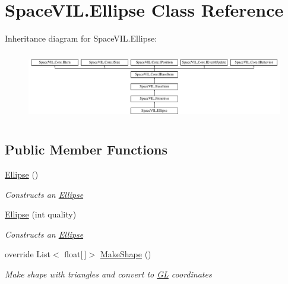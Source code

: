 \hypertarget{class_space_v_i_l_1_1_ellipse}{}\section{Space\+V\+I\+L.\+Ellipse Class Reference}
\label{class_space_v_i_l_1_1_ellipse}
Inheritance diagram for Space\+V\+I\+L.\+Ellipse\+:\begin{figure}[H]
\begin{center}
\leavevmode
\includegraphics[height=3.027027cm]{class_space_v_i_l_1_1_ellipse}
\end{center}
\end{figure}
\subsection*{Public Member Functions}
\begin{DoxyCompactItemize}
\item 
\mbox{\hyperlink{class_space_v_i_l_1_1_ellipse_a33ed4c5c8bbdb3a3fe9001292dc7b58e}{Ellipse}} ()
\begin{DoxyCompactList}\small\item\em Constructs an \mbox{\hyperlink{class_space_v_i_l_1_1_ellipse}{Ellipse}} \end{DoxyCompactList}\item 
\mbox{\hyperlink{class_space_v_i_l_1_1_ellipse_a972b5c63aba04b84274f5048351a851a}{Ellipse}} (int quality)
\begin{DoxyCompactList}\small\item\em Constructs an \mbox{\hyperlink{class_space_v_i_l_1_1_ellipse}{Ellipse}} \end{DoxyCompactList}\item 
override List$<$ float\mbox{[}$\,$\mbox{]}$>$ \mbox{\hyperlink{class_space_v_i_l_1_1_ellipse_aa2311fd87e9a988eca0d754ad6e9093d}{Make\+Shape}} ()
\begin{DoxyCompactList}\small\item\em Make shape with triangles and convert to \mbox{\hyperlink{namespace_g_l}{GL}} coordinates \end{DoxyCompactList}\end{DoxyCompactItemize}
